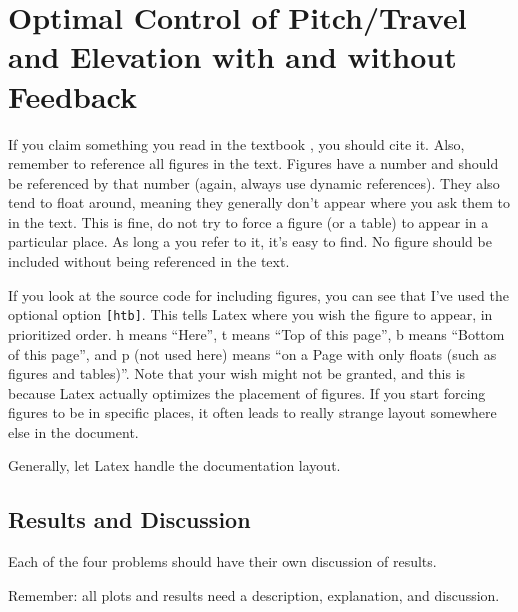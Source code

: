 \section{Optimal Control of Pitch/Travel and Elevation with and without Feedback}\label{sec:prob4}
If you claim something you read in the textbook \citep{Nocedal2006}, you should cite it. Also, remember to reference all figures in the text. Figures have a number and should be referenced by that number (again, always use dynamic references). They also tend to float around, meaning they generally don't appear where you ask them to in the text. This is fine, do not try to force a figure (or a table) to appear in a particular place. As long a you refer to it, it's easy to find. No figure should be included without being referenced in the text. 

If you look at the source code for including figures, you can see that I've used the optional option \verb+[htb]+. This tells Latex where you wish the figure to appear, in prioritized order. h means ``Here'', t means ``Top of this page'', b means ``Bottom of this page'', and p (not used here) means ``on a Page with only floats (such as figures and tables)''. Note that your wish might not be granted, and this is because Latex actually optimizes the placement of figures. If you start forcing figures to be in specific places, it often leads to really strange layout somewhere else in the document. 

Generally, let Latex handle the documentation layout.

\subsection{Results and Discussion}
Each of the four problems should have their own discussion of results. 

Remember: all plots and results need a description, explanation, and discussion.